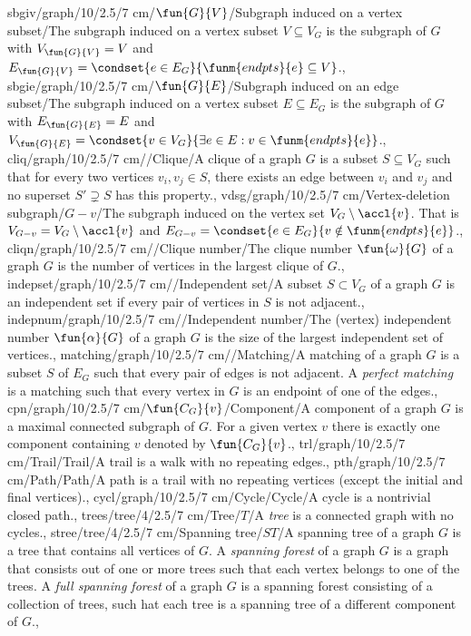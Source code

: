 sbgiv/graph/10/2.5/7 cm/{$\fun{G}{V}$}/{Subgraph induced on a vertex subset}/{The subgraph induced on a vertex subset $V\subseteq V_G$ is the subgraph of $G$ with $V_{\fun{G}{V}}=V$ and $E_{\fun{G}{V}}=\condset{e\in E_G}{\funm{endpts}{e}\subseteq V}$.},
sbgie/graph/10/2.5/7 cm/{$\fun{G}{E}$}/{Subgraph induced on an edge subset}/{The subgraph induced on a vertex subset $E\subseteq E_G$ is the subgraph of $G$ with $E_{\fun{G}{E}}=E$ and $V_{\fun{G}{E}}=\condset{v\in V_G}{\exists e\in E:v\in\funm{endpts}{e}}$.},
cliq/graph/10/2.5/7 cm/{}/{Clique}/{A clique of a graph $G$ is a subset $S\subseteq V_G$ such that for every two vertices $v_i,v_j\in S$, there exists an edge between $v_i$ and $v_j$ and no superset $S'\supsetneq S$ has this property.},
vdsg/graph/10/2.5/7 cm/{Vertex-deletion subgraph}/{$G-v$}/{The subgraph induced on the vertex set $V_G\setminus\accl{v}$. That is $V_{G-v}=V_G\setminus\accl{v}$ and $E_{G-v}=\condset{e\in E_G}{v\notin\funm{endpts}{e}}$.},
cliqn/graph/10/2.5/7 cm/{}/{Clique number}/{The clique number $\fun{\omega}{G}$ of a graph $G$ is the number of vertices in the largest clique of $G$.},
indepset/graph/10/2.5/7 cm/{}/{Independent set}/{A subset $S\subset V_G$ of a graph $G$ is an independent set if every pair of vertices in $S$ is not adjacent.},
indepnum/graph/10/2.5/7 cm/{}/{Independent number}/{The (vertex) independent number $\fun{\alpha}{G}$ of a graph $G$ is the size of the largest independent set of vertices.},
matching/graph/10/2.5/7 cm/{}/{Matching}/{A matching of a graph $G$ is a subset $S$ of $E_G$ such that every pair of edges is not adjacent. A \emph{perfect matching} is a matching such that every vertex in $G$ is an endpoint of one of the edges.},
cpn/graph/10/2.5/7 cm/{$\fun{C_G}{v}$}/{Component}/{A component of a graph $G$ is a maximal connected subgraph of $G$. For a given vertex $v$ there is exactly one component containing $v$ denoted by $\fun{C_G}{v}$.},
trl/graph/10/2.5/7 cm/{Trail}/{Trail}/{A trail is a walk with no repeating edges.},
pth/graph/10/2.5/7 cm/{Path}/{Path}/{A path is a trail with no repeating vertices (except the initial and final vertices).},
cycl/graph/10/2.5/7 cm/{Cycle}/{Cycle}/{A cycle is a nontrivial closed path.},
trees/tree/4/2.5/7 cm/Tree/$T$/{A \emph{tree} is a connected graph with no cycles.},
stree/tree/4/2.5/7 cm/{Spanning tree}/$ST$/{A spanning tree of a graph $G$ is a tree that contains all vertices of $G$. A \emph{spanning forest} of a graph $G$ is a graph that consists out of one or more trees such that each vertex belongs to one of the trees. A \emph{full spanning forest} of a graph $G$ is a spanning forest consisting of a collection of trees, such hat each tree is a spanning tree of a different component of $G$.},
